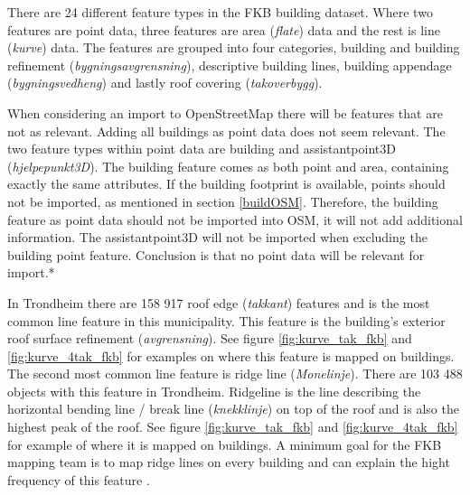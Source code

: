 There are 24 different feature types in the FKB building dataset. Where two features are point data,  three features are area  (\textit{flate}) data and the rest is line (\textit{kurve}) data.  The features are grouped into four categories, building and building refinement (\textit{bygningsavgrensning}), descriptive building lines, building appendage (\textit{bygningsvedheng}) and lastly roof covering (\textit{takoverbygg}). 

When considering an import to OpenStreetMap there will be features that are not as relevant. Adding all buildings as point data does not seem relevant. The two feature types within point data are building and assistantpoint3D (\textit{hjelpepunkt3D}). The building feature comes as both point and area, containing exactly the same attributes. If the building footprint is available, points should not be imported, as mentioned in section \ref{buildOSM}.  Therefore, the building feature as point data should not be imported into OSM, it will not add additional information. The assistantpoint3D will not be imported when excluding the building point feature. Conclusion is that no point data will be relevant for import.* %

In Trondheim there are 158 917 roof edge (\textit{takkant}) features and is the most common line feature in this municipality. This feature is the building's exterior roof surface refinement (\textit{avgrensning}). See figure \ref{fig:kurve_tak_fkb} and \ref{fig:kurve_4tak_fkb} for examples on where this feature is mapped on buildings. The second most common line feature is ridge line (\textit{Monelinje}). There are 103 488 objects with this feature in Trondheim. Ridgeline is the line describing the horizontal bending line / break line (\textit{knekklinje}) on top of the roof and is also the highest peak of the roof. See figure \ref{fig:kurve_tak_fkb} and \ref{fig:kurve_4tak_fkb} for example of where it is mapped on buildings. A minimum goal for the FKB mapping team is to map ridge lines on every building \cite{Kartverket2013a} and can explain the hight frequency of this feature \cite{Kartverket2013a}. 

